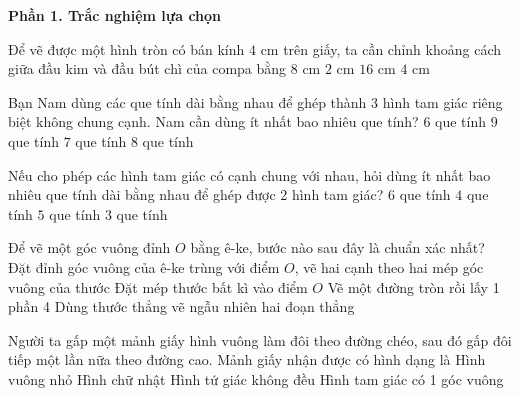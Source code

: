 \textbf{Phần 1. Trắc nghiệm lựa chọn}

\begin{ex} %
Để vẽ được một hình tròn có bán kính $4\text{ cm}$ trên giấy, ta cần chỉnh khoảng cách giữa đầu kim và đầu bút chì của compa bằng
\choice
{$8\text{ cm}$}
{$2\text{ cm}$}
{$16\text{ cm}$}
{\True $4\text{ cm}$}
\end{ex}

\begin{ex} %
Bạn Nam dùng các que tính dài bằng nhau để ghép thành 3 hình tam giác riêng biệt không chung cạnh. Nam cần dùng ít nhất bao nhiêu que tính?
\choice
{$6$ que tính}
{\True $9$ que tính}
{$7$ que tính}
{$8$ que tính}
\end{ex}

\begin{ex} %
Nếu cho phép các hình tam giác có cạnh chung với nhau, hỏi dùng ít nhất bao nhiêu que tính dài bằng nhau để ghép được 2 hình tam giác?
\choice
{$6$ que tính}
{$4$ que tính}
{\True $5$ que tính}
{$3$ que tính}
\end{ex}

\begin{ex} %
Để vẽ một góc vuông đỉnh $O$ bằng ê-ke, bước nào sau đây là chuẩn xác nhất?
\choice
{\True Đặt đỉnh góc vuông của ê-ke trùng với điểm $O$, vẽ hai cạnh theo hai mép góc vuông của thước}
{Đặt mép thước bất kì vào điểm $O$}
{Vẽ một đường tròn rồi lấy 1 phần 4}
{Dùng thước thẳng vẽ ngẫu nhiên hai đoạn thẳng}
\end{ex}

\begin{ex} %
Người ta gấp một mảnh giấy hình vuông làm đôi theo đường chéo, sau đó gấp đôi tiếp một lần nữa theo đường cao. Mảnh giấy nhận được có hình dạng là
\choice
{Hình vuông nhỏ}
{Hình chữ nhật}
{Hình tứ giác không đều}
{\True Hình tam giác có 1 góc vuông}
\end{ex}


